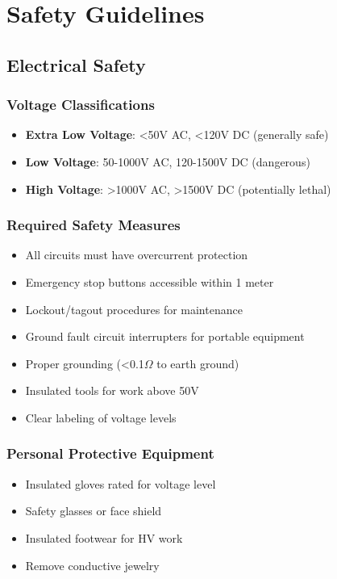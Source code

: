 
\section{Safety Guidelines}

\subsection{Electrical Safety}

\subsubsection{Voltage Classifications}
\begin{itemize}[noitemsep]
    \item \textbf{Extra Low Voltage}: <50V AC, <120V DC (generally safe)
    \item \textbf{Low Voltage}: 50-1000V AC, 120-1500V DC (dangerous)
    \item \textbf{High Voltage}: >1000V AC, >1500V DC (potentially lethal)
\end{itemize}

\subsubsection{Required Safety Measures}
\begin{itemize}[noitemsep]
    \item All circuits must have overcurrent protection
    \item Emergency stop buttons accessible within 1 meter
    \item Lockout/tagout procedures for maintenance
    \item Ground fault circuit interrupters for portable equipment
    \item Proper grounding (<0.1$\Omega$ to earth ground)
    \item Insulated tools for work above 50V
    \item Clear labeling of voltage levels
\end{itemize}

\subsubsection{Personal Protective Equipment}
\begin{itemize}[noitemsep]
    \item Insulated gloves rated for voltage level
    \item Safety glasses or face shield
    \item Insulated footwear for HV work
    \item Remove conductive jewelry
\end{itemize}

